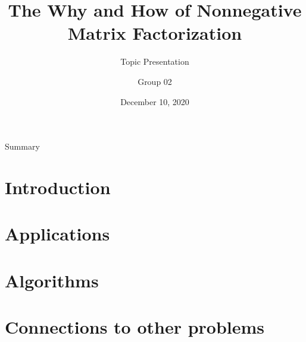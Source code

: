 \documentclass[aspectratio=43]{beamer}
\title[Nonnegative Matrix Factorization]{The Why and How of Nonnegative Matrix Factorization} %
\subtitle{Topic Presentation}
\author[Group 02]{Group 02}
\institute[LINMA2380]{
    LINMA2380 --- Matrix computations
} %
\date{December 10, 2020}
\begin{document}
    
    \frame{\titlepage}
        
    \begin{frame}{Summary}
        \tableofcontents
    \end{frame}
    \section{Introduction}
    
	\section{Applications}
    
    \section{Algorithms}
    
	\section{Connections to other problems}
	
  	\begin{frame}
  	\printbibliography
  	\end{frame}
\end{document}
